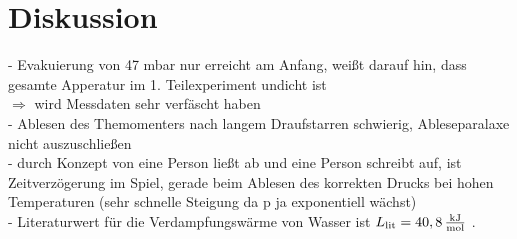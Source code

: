 \section{Diskussion}
\label{sec:Diskussion}
- Evakuierung von 47 mbar nur erreicht am Anfang, weißt darauf hin, dass gesamte Apperatur im 1. Teilexperiment undicht ist \\
$\Rightarrow$ wird Messdaten sehr verfäscht haben \\

- Ablesen des Themomenters nach langem Draufstarren schwierig, Ableseparalaxe nicht auszuschließen \\

- durch Konzept von eine Person ließt ab und eine Person schreibt auf, ist Zeitverzögerung im Spiel, gerade beim Ablesen des korrekten Drucks bei hohen Temperaturen 
(sehr schnelle Steigung da p ja exponentiell wächst)\\

- Literaturwert für die Verdampfungswärme von Wasser ist $L_{\text{lit}} = 40,8 \, \unit[per-mode=fraction]{\kilo\joule\per\mol}$ \cite{L_Literatur}.



